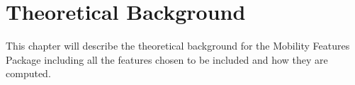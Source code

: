 \chapter{Theoretical Background}
\label{chapter:03}
This chapter will describe the theoretical background for the Mobility Features Package including all the features chosen to be included and how they are computed.



